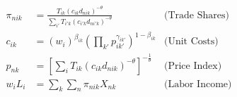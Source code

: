 \begin{align*}
    \pi_{nik} &= \frac{T_{ik} (c_{ik} d_{nik})^{-\theta}}{\sum_{i'} T_{i'k} (c_{i'k} d_{ni'k})^{-\theta}} & \text{(Trade Shares)} \\
    c_{ik} &= (w_i)^{\beta_{ik}} \left(\prod_{k'} p_{ik'}^{\gamma_{ik'}}\right)^{1 - \beta_{ik}} & \text{(Unit Costs)} \\
    p_{nk} &= \left[ \sum_{i} T_{ik} (c_{ik} d_{nik})^{-\theta} \right]^{-\frac{1}{\theta}} & \text{(Price Index)} \\
    w_i L_i &= \sum_{k} \sum_{n} \pi_{nik} X_{nk} & \text{(Labor Income)} \\
\end{align*}
